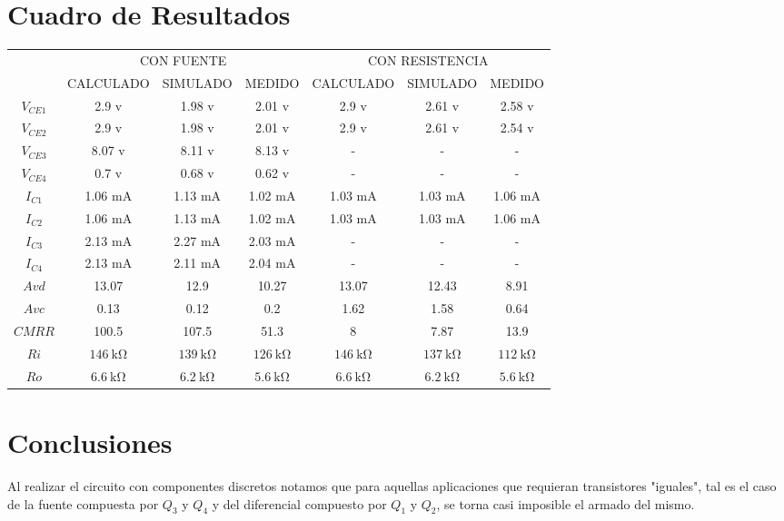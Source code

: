 \documentclass[a4paper,12pt]{article}
\newcommand{\mR}[1]{\SI{#1}{\kilo\ohm}}
\begin{document}
\section{Cuadro de Resultados}
\begin{table}[h]
    \centering
    \begin{tabular}{|c|c|c|c|c|c|c|}
        \hline
                        &   \multicolumn{3}{|c|}{CON FUENTE}     &    \multicolumn{3}{|c|}{CON RESISTENCIA}   \\ \cline{2-7}
                        & CALCULADO & SIMULADO & MEDIDO          & CALCULADO & SIMULADO & MEDIDO  \\ \hline
        $V_{CE1}$       & 2.9 v     & 1.98 v   & 2.01 v          & 2.9 v     & 2.61 v   & 2.58 v  \\
        $V_{CE2}$       & 2.9 v     & 1.98 v   & 2.01 v          & 2.9 v     & 2.61 v   & 2.54 v  \\
        $V_{CE3}$       & 8.07 v    & 8.11 v   & 8.13 v          &  -        &  -       &  -      \\
        $V_{CE4}$       & 0.7 v     & 0.68 v   & 0.62 v          &  -        &  -       &  -      \\
        $I_{C1}$        & 1.06 mA   & 1.13 mA  & 1.02 mA         & 1.03 mA   & 1.03 mA  & 1.06 mA \\
        $I_{C2}$        & 1.06 mA   & 1.13 mA  & 1.02 mA         & 1.03 mA   & 1.03 mA  & 1.06 mA \\
        $I_{C3}$        & 2.13 mA   & 2.27 mA  & 2.03 mA         &  -        &  -       &  -      \\
        $I_{C4}$        & 2.13 mA   & 2.11 mA  & 2.04 mA         &  -        &  -       &  -      \\
        $Avd$           & 13.07     & 12.9     & 10.27           & 13.07     & 12.43    & 8.91    \\
        $Avc$           & 0.13      & 0.12     & 0.2             & 1.62      & 1.58     & 0.64    \\
        $CMRR$          & 100.5     & 107.5    & 51.3            & 8         & 7.87     & 13.9    \\
        $Ri$            & $\mR{146}$ & $\mR{139}$ & $\mR{126}$       & $\mR{146}$ & $\mR{137}$ & $\mR{112}$  \\
        $Ro$            & $\mR{6.6}$ & $\mR{6.2}$ & $\mR{5.6}$       & $\mR{6.6}$ & $\mR{6.2}$ & $\mR{5.6}$  \\ \hline
    \end{tabular}
\end{table}


\section{Conclusiones}
    Al realizar el circuito con componentes discretos notamos que para aquellas aplicaciones que requieran transistores "iguales",
    tal es el caso de la fuente compuesta por $Q_3$ y $Q_4$ y del diferencial compuesto por $Q_1$ y $Q_2$, se torna casi imposible el armado
    del mismo.
\end{document}
